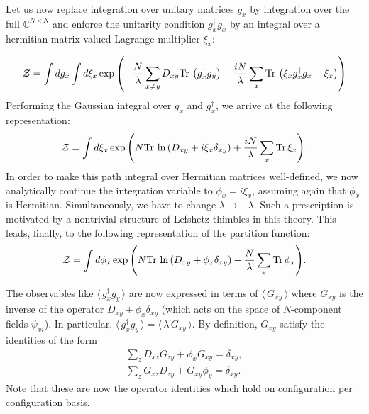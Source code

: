 \documentclass[twocolumn,showpacs,preprintnumbers,superscriptaddress,amsmath,floatfix,amssymb,secnumarabic]{revtex4}
\newcommand{\lr}[1]{ \left( #1 \right) }
\newcommand{\vev}[1]{ \langle \, #1 \, \rangle }
\newcommand{\tr}{ {\rm Tr} \, }
\newcommand{\expa}[1]{ \exp{\left( #1 \right)} }
\begin{document}
Let us now replace integration over unitary matrices $g_x$ by integration over the full $\mathbb{C}^{N \times N}$ and enforce the unitarity condition $g^{\dag}_x g_x$ by an integral over a hermitian-matrix-valued Lagrange multiplier $\xi_x$:
\begin{widetext}
\begin{eqnarray}
\label{sm_partition_matrix_lagrange}
 \mathcal{Z} = \int dg_x \int d\xi_x \expa{ - \frac{N}{\lambda} \sum\limits_{x \neq y} D_{xy} \tr\lr{g^{\dag}_x g_y} - \frac{i N}{\lambda} \sum\limits_x \tr\lr{\xi_x  g^{\dag}_x g_x - \xi_x} }
\end{eqnarray}
Performing the Gaussian integral over $g_x$ and $g^{\dag}_x$, we arrive at the following representation:
\begin{eqnarray}
\label{sm_partition_matrix_lagrange_only_imaginary}
 \mathcal{Z} = \int d\xi_x
 \expa{N \tr\ln\lr{D_{xy} + i \xi_x \delta_{xy}} + \frac{i N}{\lambda} \sum\limits_x \tr \xi_x } .
\end{eqnarray}
In order to make this path integral over Hermitian matrices well-defined, we now analytically continue the integration variable to $\phi_x = i \xi_x$, assuming again that $\phi_x$ is Hermitian. Simultaneously, we have to change $\lambda \rightarrow -\lambda$. Such a prescription is motivated by a nontrivial structure of Lefshetz thimbles in this theory. This leads, finally, to the following representation of the partition function:
\begin{eqnarray}
\label{sm_partition_matrix_lagrange_only}
 \mathcal{Z} = \int d\phi_x
 \expa{N \tr\ln\lr{D_{xy} + \phi_x \delta_{xy}} - \frac{N}{\lambda} \sum\limits_x \tr \phi_x } .
\end{eqnarray}
\end{widetext}

 The observables like $\vev{g^{\dag}_x g_y }$ are now expressed in terms of $\vev{G_{xy}}$ where $G_{xy}$ is the inverse of the operator $D_{xy} + \phi_x \delta_{xy}$ (which acts on the space of $N$-component fields $\psi_{x i}$). In particular, $\vev{g^{\dag}_x g_y } = \vev{\lambda \, G_{xy}}$. By definition, $G_{xy}$ satisfy the identities of the form
\begin{eqnarray}
\label{G_identities}
 \sum\limits_z D_{xz} G_{zy} + \phi_x G_{xy} = \delta_{x y} ,
 \nonumber \\
 \sum\limits_z G_{xz} D_{zy} + G_{xy} \phi_y = \delta_{x y} .
\end{eqnarray}
Note that these are now the operator identities which hold on configuration per configuration basis.
\end{document}
